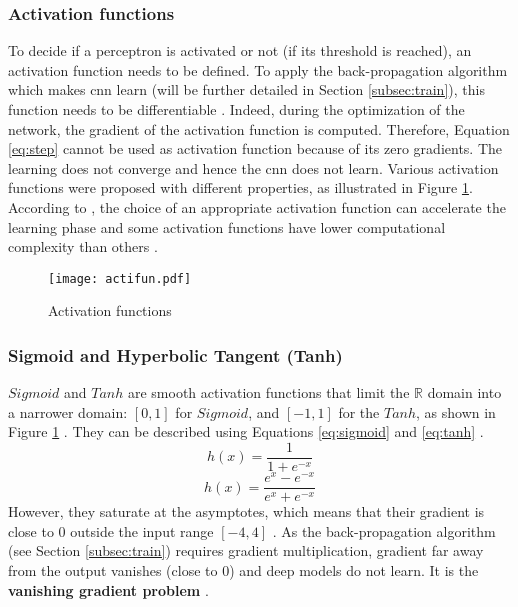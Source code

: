\subsubsection{Activation functions} \label{subs:acti}
To decide if a perceptron is activated or not (if its threshold is reached), an activation function needs to be defined. To apply the back-propagation algorithm which makes \acrshort{cnn} learn (will be further detailed in Section \ref{subsec:train}), this function needs to be differentiable \cite{lecun_backpropagation_1989}. Indeed, during the optimization of the network, the gradient of the activation function is computed. Therefore, Equation \ref{eq:step} cannot be used as activation function because of its zero gradients. The learning does not converge and hence the \acrshort{cnn} does not learn. Various activation functions were proposed with different properties, as illustrated in Figure \ref{fig:acti}. According to \textcite{khan_survey_2020}, the choice of an appropriate activation function can accelerate the learning phase and some activation functions have lower computational complexity than others \cite{krizhevsky_imagenet_2012}.
%
\begin{figure}[H]
    \centering
    \texttt{[image: actifun.pdf]}
    \caption{Activation functions}
    \label{fig:acti}
\end{figure}
%
\subsubsection{Sigmoid and Hyperbolic Tangent (Tanh)}
$Sigmoid$ and $Tanh$ are smooth activation functions that limit the $\mathbb{R}$ domain into a narrower domain: $[0, 1]$ for $Sigmoid$, and $[-1, 1]$ for the $Tanh$, as shown in Figure \ref{fig:acti} \cite{matteucci_artificial_2019}. They can be described using Equations \eqref{eq:sigmoid} and \eqref{eq:tanh} \cite{krizhevsky_imagenet_2012}.
%
\begin{equation}
    h(x) = \frac{1}{1 + e^{-x}}
    \label{eq:sigmoid}
\end{equation}
%
\begin{equation}
    h(x) = \frac{e^{x} - e^{-x}}{e^{x} + e^{-x}}
    \label{eq:tanh}
\end{equation}
%
However, they saturate at the asymptotes, which means that their gradient is close to 0 outside the input range $[-4, 4]$ \cite{glorot_understanding_2010}. As the back-propagation algorithm (see Section \ref{subsec:train}) requires gradient multiplication, gradient far away from the output vanishes (close to 0) and deep models do not learn. It is the \textbf{vanishing gradient problem} \cite{khan_survey_2020, matteucci_artificial_2019, goodfellow_deep_2016, maas_rectier_2013}.
%
